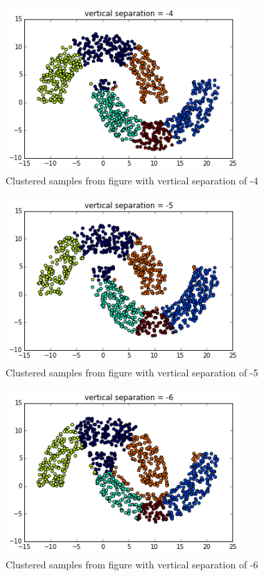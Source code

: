\documentclass[paper=a4, fontsize=11pt]{scrartcl} %
\numberwithin{equation}{section} %
\numberwithin{figure}{section} %
\numberwithin{table}{section} %
\begin{document}
\begin{figure}[ht]
	\centering
  \includegraphics[width=0.8\textwidth]{vn4.png}
	\caption{Clustered samples from figure with vertical separation of -4}
	\label{figvn4}
\end{figure}
\begin{figure}[ht]
	\centering
  \includegraphics[width=0.8\textwidth]{vn5.png}
	\caption{Clustered samples from figure with vertical separation of -5}
	\label{figvn5}
\end{figure}
\begin{figure}[ht]
	\centering
  \includegraphics[width=0.8\textwidth]{vn6.png}
	\caption{Clustered samples from figure with vertical separation of -6}
	\label{figvn6}
\end{figure}
\end{document}
